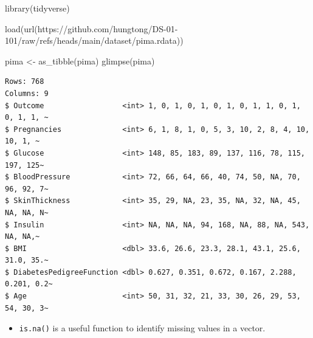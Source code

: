 \documentclass[
  letterpaper,
  DIV=11,
  numbers=noendperiod]{scrreprt}
\newenvironment{Shaded}{\begin{snugshade}}{\end{snugshade}}
\newcommand{\CommentTok}[1]{\textcolor[rgb]{0.37,0.37,0.37}{#1}}
\newcommand{\FunctionTok}[1]{\textcolor[rgb]{0.28,0.35,0.67}{#1}}
\newcommand{\NormalTok}[1]{\textcolor[rgb]{0.00,0.23,0.31}{#1}}
\newcommand{\OtherTok}[1]{\textcolor[rgb]{0.00,0.23,0.31}{#1}}
\newcommand{\SpecialCharTok}[1]{\textcolor[rgb]{0.37,0.37,0.37}{#1}}
\newcommand{\StringTok}[1]{\textcolor[rgb]{0.13,0.47,0.30}{#1}}
\providecommand{\tightlist}{%
  \setlength{\itemsep}{0pt}\setlength{\parskip}{0pt}}\usepackage{longtable,booktabs,array}
\begin{document}
\begin{Shaded}
\begin{Highlighting}[]
\FunctionTok{library}\NormalTok{(tidyverse)}

\FunctionTok{load}\NormalTok{(}\FunctionTok{url}\NormalTok{(}\StringTok{\textquotesingle{}https://github.com/hungtong/DS{-}01{-}101/raw/refs/heads/main/dataset/pima.rdata\textquotesingle{}}\NormalTok{))}

\NormalTok{pima }\OtherTok{\textless{}{-}} \FunctionTok{as\_tibble}\NormalTok{(pima)}
\FunctionTok{glimpse}\NormalTok{(pima)}
\end{Highlighting}
\end{Shaded}

\begin{verbatim}
Rows: 768
Columns: 9
$ Outcome                  <int> 1, 0, 1, 0, 1, 0, 1, 0, 1, 1, 0, 1, 0, 1, 1, ~
$ Pregnancies              <int> 6, 1, 8, 1, 0, 5, 3, 10, 2, 8, 4, 10, 10, 1, ~
$ Glucose                  <int> 148, 85, 183, 89, 137, 116, 78, 115, 197, 125~
$ BloodPressure            <int> 72, 66, 64, 66, 40, 74, 50, NA, 70, 96, 92, 7~
$ SkinThickness            <int> 35, 29, NA, 23, 35, NA, 32, NA, 45, NA, NA, N~
$ Insulin                  <int> NA, NA, NA, 94, 168, NA, 88, NA, 543, NA, NA,~
$ BMI                      <dbl> 33.6, 26.6, 23.3, 28.1, 43.1, 25.6, 31.0, 35.~
$ DiabetesPedigreeFunction <dbl> 0.627, 0.351, 0.672, 0.167, 2.288, 0.201, 0.2~
$ Age                      <int> 50, 31, 32, 21, 33, 30, 26, 29, 53, 54, 30, 3~
\end{verbatim}

\begin{itemize}
\tightlist
\item
  \texttt{is.na()} is a useful function to identify missing values in a
  vector.
\end{itemize}

\begin{Shaded}
\end{Shaded}
\end{document}
